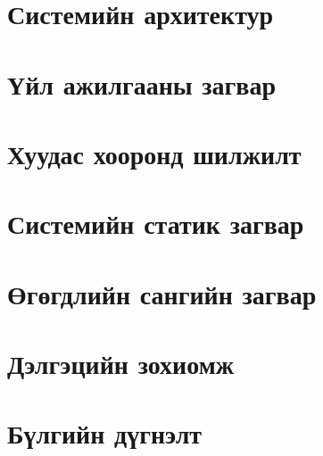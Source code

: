 \section{Системийн архитектур}


\section{Үйл ажилгааны загвар}


\section{Хуудас хооронд шилжилт}


\section{Системийн статик загвар}



\section{Өгөгдлийн сангийн загвар}



\section{Дэлгэцийн зохиомж}


\section{Бүлгийн дүгнэлт}




